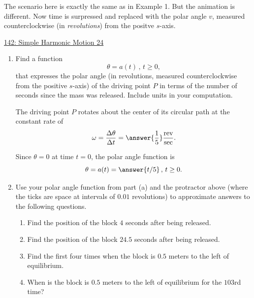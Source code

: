 \documentclass{ximera}
\begin{document}
\begin{example} \label{ExL9df93r3}
The scenario here is exactly the same as in Example 1. But the animation is different. Now time is surpressed and replaced with the polar angle $v$, measured counterclockwise (in \emph{revolutions}) from the positve $s$-axis.

\begin{onlineOnly}
    \begin{center}
\end{center}
\end{onlineOnly}

\href{https://www.desmos.com/calculator/um74xweymf}{142: Simple Harmonic Motion 24}

\begin{enumerate}
\item Find a function 
\[
     \theta = a(t) \, , \, t\geq 0,
\]
that expresses the polar angle (in revolutions, measured counterclockwise from the positive $s$-axis) of the driving point $P$ in terms of the number of seconds since the mass was released. Include units in your computation.

The driving point $P$ rotates about the center of its circular path at the constant rate of 
\[
     \omega = \frac{\Delta \theta}{\Delta t}  = \answer{\frac{1}{5}} \frac{\text{rev}}{\text{sec}}.
\]

Since $\theta=0$ at time $t=0$, the polar angle function is
\[
   \theta = a(t) =  \answer{t/5} \, , \, t \geq 0.
\]

\item Use your polar angle function from part (a) and the protractor above (where the ticks are space at intervals of $0.01$ revolutions) to approximate answers to the following questions.

\begin{enumerate}
\item Find the position of the block $4$ seconds after being released.

\item Find the position of the block $24.5$ seconds after being released.

\item Find the first four times when the block is $0.5$ meters to the left of equilibrium.

\item When is the block is $0.5$ meters to the left of equilibrium for the $103$rd time?
\end{enumerate}
\end{enumerate}


\end{example}
\end{document}
